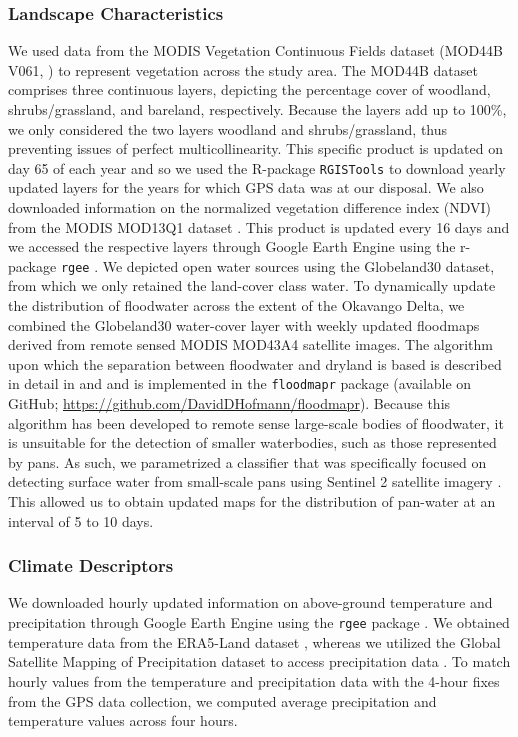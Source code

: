 \documentclass[abstract=on,10pt,a4paper,bibliography=totocnumbered]{article}
\begin{document}
\subsubsection{Landscape Characteristics}
We used data from the MODIS Vegetation Continuous Fields dataset (MOD44B V061,
\citealp{DiMiceli.2022}) to represent vegetation across the study area. The
MOD44B dataset comprises three continuous layers, depicting the percentage cover
of \textsf{woodland}, \textsf{shrubs/grassland}, and \textsf{bareland},
respectively. Because the layers add up to 100\%, we only considered the two
layers \textsf{woodland} and \textsf{shrubs/grassland}, thus preventing issues
of perfect multicollinearity. This specific product is updated on day 65 of each
year and so we used the R-package \texttt{RGISTools} \citep{Perez-Goya.2020} to
download yearly updated layers for the years for which GPS data was at our
disposal. We also downloaded information on the normalized vegetation difference
index (NDVI) from the MODIS MOD13Q1 dataset \citep{Didan.2015}. This product is
updated every 16 days and we accessed the respective layers through Google Earth
Engine \citep{Gorelick.2017} using the r-package \texttt{rgee}
\citep{Aybar.2023}. We depicted open water sources using the Globeland30
dataset, from which we only retained the land-cover class water. To dynamically
update the distribution of floodwater across the extent of the Okavango Delta,
we combined the Globeland30 water-cover layer with weekly updated floodmaps
derived from remote sensed MODIS MOD43A4 satellite images. The algorithm upon
which the separation between floodwater and dryland is based is described in
detail in \cite{Wolski.2017} and \cite{Hofmann.2021} and is implemented in the
\texttt{floodmapr} package (available on GitHub;
\url{https://github.com/DavidDHofmann/floodmapr}). Because this algorithm has
been developed to remote sense large-scale bodies of floodwater, it is
unsuitable for the detection of smaller waterbodies, such as those represented
by pans. As such, we parametrized a classifier that was specifically focused on
detecting surface water from small-scale pans using Sentinel 2 satellite imagery
\citep{EuropeanSpaceAgency.2018}. This allowed us to obtain updated maps for the
distribution of pan-water at an interval of 5 to 10 days.

\subsubsection{Climate Descriptors}
We downloaded hourly updated information on above-ground temperature and
precipitation through Google Earth Engine \citep{Gorelick.2017} using the
\texttt{rgee} package \citep{Aybar.2023}. We obtained temperature data from the
ERA5-Land dataset \citep{Munoz-Sabater.2021}, whereas we utilized the Global
Satellite Mapping of Precipitation dataset to access precipitation data
\citep{Kubota.2020}. To match hourly values from the temperature and
precipitation data with the 4-hour fixes from the GPS data collection, we
computed average precipitation and temperature values across four hours.
\end{document}
